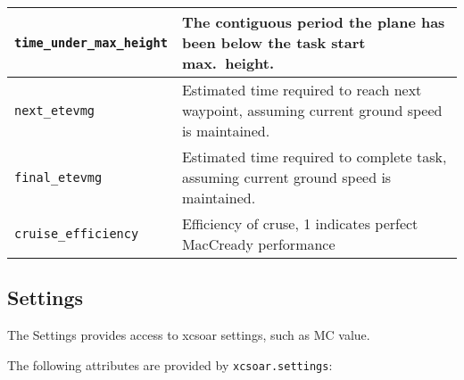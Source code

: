 \begin{maxipage}
\begin{tabularx}{1.9\textwidth}{l|X}
\hline

\verb|time_under_max_height| & The contiguous period the plane has
been below the task \newline start max.\ height. \\

\hline

\verb|next_etevmg| & Estimated time required to reach next waypoint,
assuming current \newline ground speed is maintained. \\

\hline

\verb|final_etevmg| & Estimated time required to complete task,
assuming current ground \newline speed is maintained. \\

\hline

\verb|cruise_efficiency| & Efficiency of cruse, 1 indicates perfect
MacCready performance \\


\end{tabularx}
\end{maxipage}

\subsection{Settings}\label{sec:lua.settings}

The Settings provides access to xcsoar settings, such as MC value.

The following attributes are provided by \verb|xcsoar.settings|:

